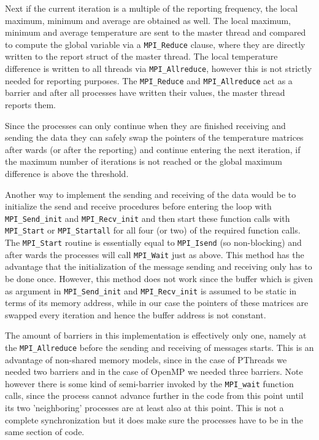\documentclass[11pt,a4paper,onecolumn]{article}
\begin{document}
Next if the current iteration is a multiple of the reporting frequency, the local maximum, minimum and average are obtained as well. The local maximum, minimum and average temperature are sent to the master thread and compared to compute the global variable via a \texttt{MPI\_Reduce} clause, where they are directly written to the report struct of the master thread. The local temperature difference is written to all threads via \texttt{MPI\_Allreduce}, however this is not strictly needed for reporting purposes. The \texttt{MPI\_Reduce} and \texttt{MPI\_Allreduce} act as a barrier and after all processes have written their values, the master thread reports them.

Since the processes can only continue when they are finished receiving and sending the data they can safely swap the pointers of the temperature matrices after wards (or after the reporting) and continue entering the next iteration, if the maximum number of iterations is not reached or the global maximum difference is above the threshold.

Another way to implement the sending and receiving of the data would be to initialize the send and receive procedures before entering the loop with \texttt{MPI\_Send\_init} and \texttt{MPI\_Recv\_init} and then start these function calls with \texttt{MPI\_Start} or \texttt{MPI\_Startall} for all four (or two) of the required function calls. The \texttt{MPI\_Start} routine is essentially equal to \texttt{MPI\_Isend} (so non-blocking) and after wards the processes will call \texttt{MPI\_Wait} just as above. This method has the advantage that the initialization of the message sending and receiving only has to be done once. However, this method does not work since the buffer which is given as argument in \texttt{MPI\_Send\_init} and \texttt{MPI\_Recv\_init} is assumed to be static in terms of its memory address, while in our case the pointers of these matrices are swapped every iteration and hence the buffer address is not constant.

The amount of barriers in this implementation is effectively only one, namely at the \texttt{MPI\_Allreduce} before the sending and receiving of messages starts. This is an advantage of non-shared memory models, since in the case of PThreads we needed two barriers and in the case of OpenMP we needed three barriers. Note however there is some kind of semi-barrier invoked by the \texttt{MPI\_wait} function calls, since the process cannot advance further in the code from this point until its two 'neighboring' processes are at least also at this point. This is not a complete synchronization but it does make sure the processes have to be in the same section of code.
\end{document}
